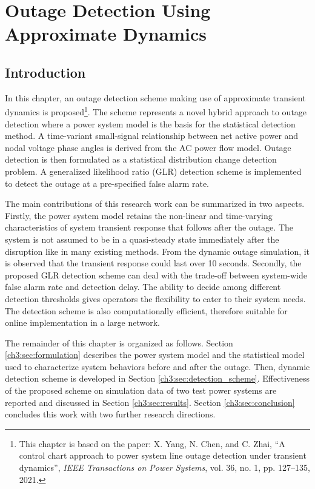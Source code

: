 
\chapter{Outage Detection Using Approximate Dynamics}
\label{ch:detection_using_approximate_dynamics}
\vspace{2em}

\section{Introduction} %
\label{ch3:sec:introduction}

In this chapter, an outage detection scheme making use of approximate transient dynamics is proposed\footnote{This chapter is based on the paper: X. Yang, N. Chen, and C. Zhai, “A control chart approach to power system line outage detection under transient dynamics”, \textit{IEEE Transactions on Power Systems}, vol. 36, no. 1, pp. 127–135, 2021.}. The scheme represents a novel hybrid approach to outage detection where a power system model is the basis for the statistical detection method. A time-variant small-signal relationship between net active power and nodal voltage phase angles is derived from the AC power flow model. Outage detection is then formulated as a statistical distribution change detection problem. A generalized likelihood ratio (GLR) detection scheme is implemented to detect the outage at a pre-specified false alarm rate. 

The main contributions of this research work can be summarized in two aspects. Firstly, the power system model retains the non-linear and time-varying characteristics of system transient response that follows after the outage. The system is not assumed to be in a quasi-steady state immediately after the disruption like in many existing methods. From the dynamic outage simulation, it is observed that the transient response could last over 10 seconds. Secondly, the proposed GLR detection scheme can deal with the trade-off between system-wide false alarm rate and detection delay. The ability to decide among different detection thresholds gives operators the flexibility to cater to their system needs. The detection scheme is also computationally efficient, therefore suitable for online implementation in a large network.

The remainder of this chapter is organized as follows. Section \ref{ch3:sec:formulation} describes the power system model and the statistical model used to characterize system behaviors before and after the outage. Then, dynamic detection scheme is developed in Section \ref{ch3:sec:detection_scheme}. Effectiveness of the proposed scheme on simulation data of two test power systems are reported and discussed in Section \ref{ch3:sec:results}. Section \ref{ch3:sec:conclusion} concludes this work with two further research directions.


